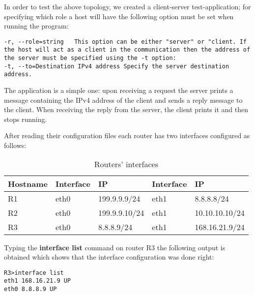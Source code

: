 {{\begin{comment}
  -l, --lkl                  -means that this application uses LKL
  -p, --port=int             Port
  -r, --role=string          server/client
  -t, --to=Destination IPv4 address
                             IPv4 destination
\end{comment}
In order to test the above topology, we created a client-server test-application; for specifying which role a host will have the following option must be set when running the program:
\begin{lstlisting}
-r, --role=string   This option can be either "server" or "client. If the host will act as a client in the communication then the address of the server must be specified using the -t option:
-t, --to=Destination IPv4 address Specify the server destination address.
\end{lstlisting} 
The application is a simple one: upon receiving a request the server prints a message containing the 
IPv4 address of the client and sends a reply message to the client. When receiving the reply from the server, the client prints it and then stops running.

After reading their configuration files each router has two interfaces configured as follows:
\begin{center}
  \begin{table}[htb]
  \begin{center}
  \begin{tabular}{| l | l | l | l | l |}
    \hline
      Hostname & Interface & IP & Interface & IP \\ \hline
      R1 & eth0 & 199.9.9.9/24 & eth1 & 8.8.8.8/24 \\ \hline
      R2 & eth0 & 199.9.9.10/24 & eth1 & 10.10.10.10/24\\ \hline
      R3 & eth0 & 8.8.8.9/24 & eth1 & 168.16.21.9/24 \\
    \hline
  \end{tabular}
  \end{center}
  \caption{Routers' interfaces}
  \label{table:tdevices}
  \end{table}
\end{center}
Typing the \textbf{interface list} command on router R3 the following output is obtained which shows that the interface configuration was done right:
\lstset{language=TeX, caption=Router R3 interfaces}
\begin{lstlisting}
R3>interface list  
eth1 168.16.21.9 UP
eth0 8.8.8.9 UP
\end{lstlisting}

}}
